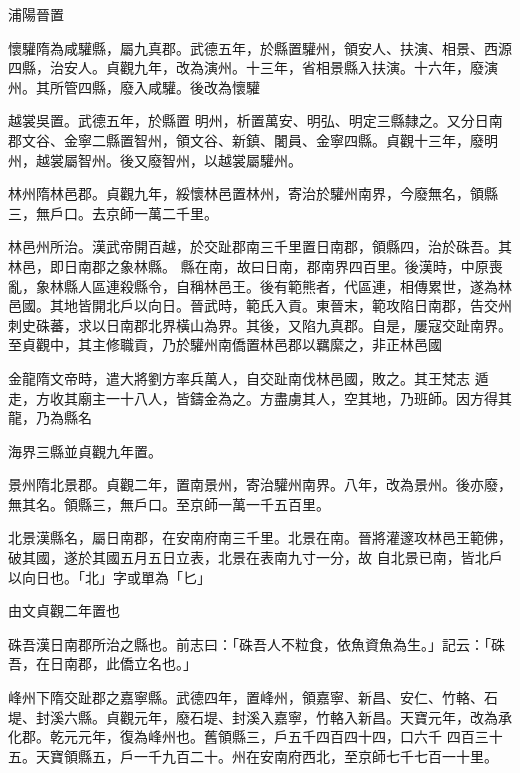 \begin{pinyinscope}
 浦陽晉置



 懷驩隋為咸驩縣，屬九真郡。武德五年，於縣置驩州，領安人、扶演、相景、西源四縣，治安人。貞觀九年，改為演州。十三年，省相景縣入扶演。十六年，廢演州。其所管四縣，廢入咸驩。後改為懷驩



 越裳吳置。武德五年，於縣置
 明州，析置萬安、明弘、明定三縣隸之。又分日南郡文谷、金寧二縣置智州，領文谷、新鎮、闍員、金寧四縣。貞觀十三年，廢明州，越裳屬智州。後又廢智州，以越裳屬驩州。



 林州隋林邑郡。貞觀九年，綏懷林邑置林州，寄治於驩州南界，今廢無名，領縣三，無戶口。去京師一萬二千里。



 林邑州所治。漢武帝開百越，於交趾郡南三千里置日南郡，領縣四，治於硃吾。其林邑，即日南郡之象林縣。
 縣在南，故曰日南，郡南界四百里。後漢時，中原喪亂，象林縣人區連殺縣令，自稱林邑王。後有範熊者，代區連，相傳累世，遂為林邑國。其地皆開北戶以向日。晉武時，範氏入貢。東晉末，範攻陷日南郡，告交州刺史硃蕃，求以日南郡北界橫山為界。其後，又陷九真郡。自是，屢寇交趾南界。至貞觀中，其主修職貢，乃於驩州南僑置林邑郡以羈縻之，非正林邑國



 金龍隋文帝時，遣大將劉方率兵萬人，自交趾南伐林邑國，敗之。其王梵志
 遁走，方收其廟主一十八人，皆鑄金為之。方盡虜其人，空其地，乃班師。因方得其龍，乃為縣名



 海界三縣並貞觀九年置。



 景州隋北景郡。貞觀二年，置南景州，寄治驩州南界。八年，改為景州。後亦廢，無其名。領縣三，無戶口。至京師一萬一千五百里。



 北景漢縣名，屬日南郡，在安南府南三千里。北景在南。晉將灌邃攻林邑王範佛，破其國，遂於其國五月五日立表，北景在表南九寸一分，故
 自北景已南，皆北戶以向日也。「北」字或單為「匕」



 由文貞觀二年置也



 硃吾漢日南郡所治之縣也。前志曰：「硃吾人不粒食，依魚資魚為生。」記云：「硃吾，在日南郡，此僑立名也。」



 峰州下隋交趾郡之嘉寧縣。武德四年，置峰州，領嘉寧、新昌、安仁、竹輅、石堤、封溪六縣。貞觀元年，廢石堤、封溪入嘉寧，竹輅入新昌。天寶元年，改為承化郡。乾元元年，復為峰州也。舊領縣三，戶五千四百四十四，口六千
 四百三十五。天寶領縣五，戶一千九百二十。州在安南府西北，至京師七千七百一十里。




\end{pinyinscope}
